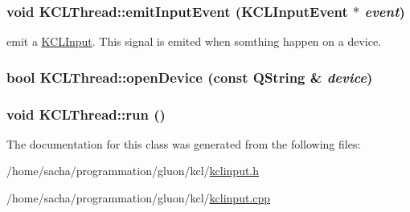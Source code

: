 \hypertarget{class_k_c_l_thread_318807205f19ec5cfbeee2200dbbf995}{
\subsubsection[{emitInputEvent}]{\setlength{\rightskip}{0pt plus 5cm}void KCLThread::emitInputEvent ({\bf KCLInputEvent} $\ast$ {\em event})}}
\label{class_k_c_l_thread_318807205f19ec5cfbeee2200dbbf995}


emit a \hyperlink{class_k_c_l_input}{KCLInput}. This signal is emited when somthing happen on a device. \hypertarget{class_k_c_l_thread_2b5d9cafcdbbf26ceac9cc9cce9427dc}{
\subsubsection[{openDevice}]{\setlength{\rightskip}{0pt plus 5cm}bool KCLThread::openDevice (const QString \& {\em device})}}
\label{class_k_c_l_thread_2b5d9cafcdbbf26ceac9cc9cce9427dc}


\hypertarget{class_k_c_l_thread_12a55f25353d1ba81fc237a1c9dc22b5}{
\subsubsection[{run}]{\setlength{\rightskip}{0pt plus 5cm}void KCLThread::run ()}}
\label{class_k_c_l_thread_12a55f25353d1ba81fc237a1c9dc22b5}




The documentation for this class was generated from the following files:\begin{CompactItemize}
\item 
/home/sacha/programmation/gluon/kcl/\hyperlink{kclinput_8h}{kclinput.h}\item 
/home/sacha/programmation/gluon/kcl/\hyperlink{kclinput_8cpp}{kclinput.cpp}\end{CompactItemize}
